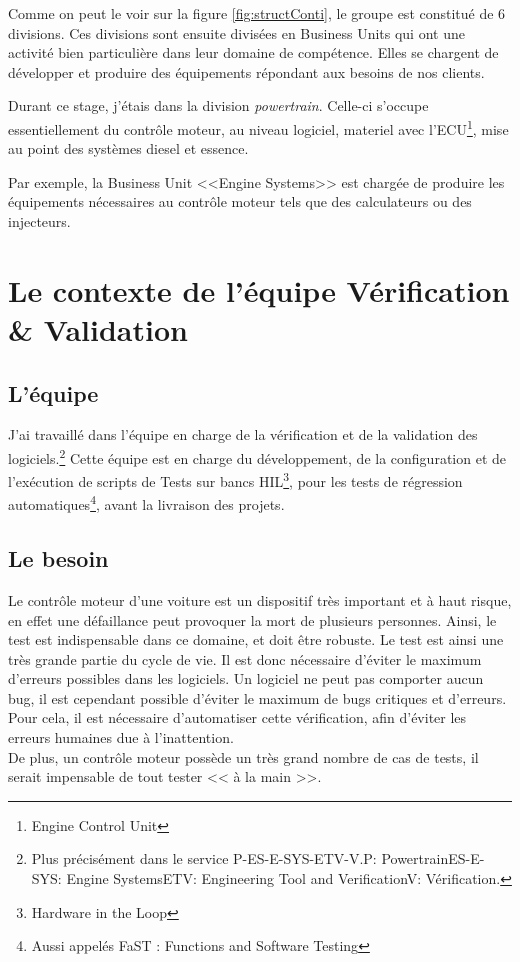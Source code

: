 		Comme on peut le voir sur la figure \ref{fig:structConti}, le groupe est constitué de 6 divisions. Ces divisions sont ensuite divisées en Business Units qui ont une activité bien particulière dans leur domaine de compétence. Elles se chargent de développer et produire des équipements répondant aux besoins de nos clients.

Durant ce stage, j'étais dans la division \textit{powertrain}. Celle-ci s'occupe essentiellement du contrôle moteur, au niveau logiciel, materiel avec l'ECU\footnote{Engine Control Unit}, mise au point des systèmes diesel et essence.

Par exemple, la Business Unit <<Engine Systems>> est chargée de produire les équipements nécessaires au contrôle moteur tels que des calculateurs ou des 
injecteurs.

	\section{Le contexte de l'équipe Vérification \& Validation}
		\subsection{L'équipe}
		J'ai travaillé dans l'équipe en charge de la vérification et de la validation des logiciels.\footnote{Plus précisément dans le service P-ES-E-SYS-ETV-V.\newline P: Powertrain\newline ES-E-SYS: Engine Systems\newline ETV: Engineering Tool and Verification\newline V: Vérification.}
		Cette équipe est en charge du développement, de la configuration et de l'exécution de scripts de Tests sur bancs HIL\footnote{Hardware in the Loop}, pour les tests de régression automatiques\footnote{Aussi appelés FaST : Functions and Software Testing}, avant la livraison des projets.
		
		\subsection{Le besoin} \label{besoinTests}
		Le contrôle moteur d'une voiture est un dispositif très important et à haut risque, en effet une défaillance peut provoquer la mort de plusieurs personnes. Ainsi, le test est indispensable dans ce domaine, et doit être robuste. Le test est ainsi une très grande partie du cycle de vie.\newline
		 Il est donc nécessaire d'éviter le maximum d'erreurs possibles dans les logiciels. Un logiciel ne peut pas comporter aucun bug, il est cependant possible d'éviter le maximum de bugs critiques et d'erreurs. Pour cela, il est nécessaire d'automatiser cette vérification, afin d'éviter les erreurs humaines due à l'inattention.\\
		De plus, un contrôle moteur possède un très grand nombre de cas de tests, il serait impensable de tout tester << à la main >>.

